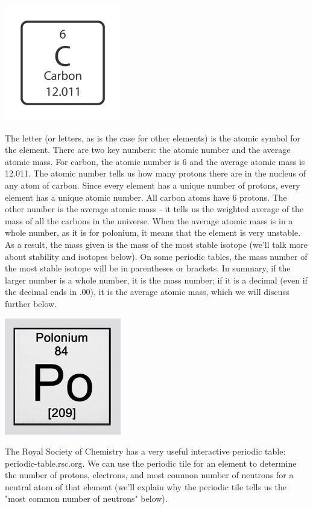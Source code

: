 \begin{center}
\includegraphics[width=2in]{carbon_tile.png}
\end{center}

The letter (or letters, as is the case for other elements) is the atomic symbol
for the element. There are two key numbers: the atomic number and the average
atomic mass. For carbon, the atomic number is 6 and the average atomic mass is
12.011. The atomic number tells us how many protons there are in the nucleus of
any atom of carbon. Since every element has a unique number of protons, every
element has a unique atomic number. All carbon atoms have 6 protons. The other
number is the average atomic mass - it tells us the weighted average of the
mass of all the carbons in the universe. When the average atomic mass is in
a whole number, as it is for polonium, it means that the element is very unstable.
As a result, the mass given is the mass of the most stable isotope (we'll talk
more about stability and isotopes below). On some periodic tables, the mass
number of the most stable isotope will be in parentheses or brackets. In
summary, if the larger number is a whole number, it is the mass number; if it
is a decimal (even if the decimal ends in .00), it is the average atomic mass,
which we will discuss further below.

\begin{center}
\includegraphics[width=2in]{polonium_tile.png}
\end{center}

The Royal Society of Chemistry has a very useful interactive periodic table:
periodic-table.rsc.org. We can use the periodic tile for an element to
determine the number of protons, electrons, and most common number of neutrons
for a neutral atom of that element (we'll explain why the periodic tile tells
us the "most common number of neutrons" below).

